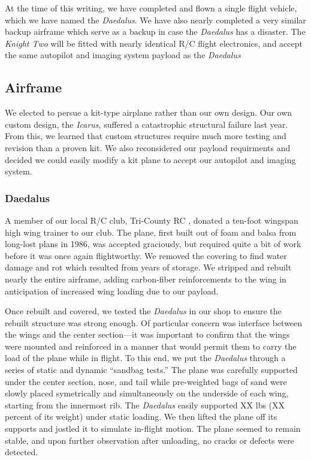 \documentclass[10pt]{report}
\begin{document}
At the time of this writing, we have completed and flown a single flight vehicle, which we have named the \emph{Daedalus}.
We have also nearly completed a very similar backup airframe which serve as a backup in case the \emph{Daedalus} has a disaster. The \emph{Knight Two} will be fitted with nearly identical R/C flight electronics, and accept the same autopilot and imaging system payload as the \emph{Daedalus}

\subsection{Airframe}

We elected to persue a kit-type airplane rather than our own design. 
Our own custom design, the \emph{Icarus}, suffered a catastrophic structural failure last year. From this, we learned that custom structures require much more testing and revision than a proven kit. We also reconsidered our payload requirments and decided we could easily modify a kit plane to accept our autopilot and imaging system.

\subsubsection{Daedalus}

A member of our local R/C club, Tri-County RC \cite{tricountyRC}, donated a ten-foot wingspan high wing trainer to our club. The plane, first built out of foam and balsa from long-lost plans in 1986, was accepted graciously, but required quite a bit of work before it was once again flightworthy. We removed the covering to find water damage and rot which resulted from years of storage. We stripped and rebuilt nearly the entire airframe, adding carbon-fiber reinforcements to the wing in anticipation of increased wing loading due to our payload.


Once rebuilt and covered, we tested the \emph{Daedalus} in our shop to ensure the rebuilt structure was strong enough. Of particular concern was interface between the wings and the center section---it was important to confirm that the wings were mounted and reinforced in a manner that would permit them to carry the load of the plane while in flight.  To this end, we put the \emph{Daedalus} through a series of static and dynamic ``sandbag tests.''  The plane was carefully supported under the center section, nose, and tail while pre-weighted bags of sand were slowly placed symetrically and simultaneously on the underside of each wing, starting from the innermost rib.  The \emph{Daedalus} easily supported XX lbs (XX percent of its weight) under static loading.  We then lifted the plane off its supports and jostled it to simulate in-flight motion.  The plane seemed to remain stable, and upon further observation after unloading, no cracks or defects were detected.
\end{document}
